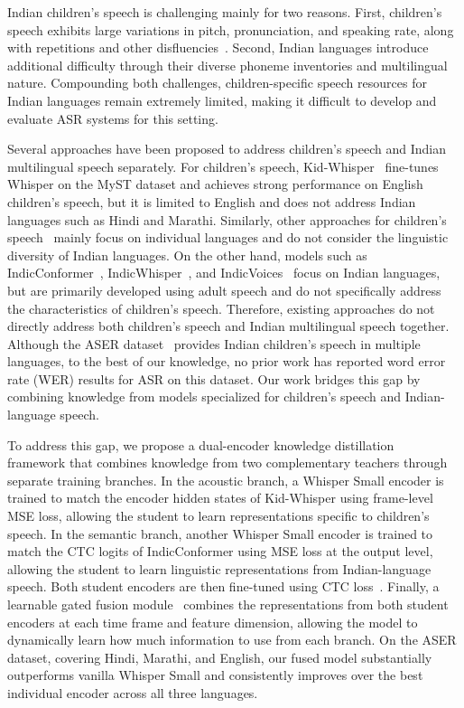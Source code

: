 \documentclass{article} %
\begin{document}
Indian children's speech is challenging mainly for two reasons. First, children's speech exhibits large variations in pitch, pronunciation, and speaking rate, along with repetitions and other disfluencies~\citep{lee1999acoustics}. Second, Indian languages introduce additional difficulty through their diverse phoneme inventories and multilingual nature. Compounding both challenges, children-specific speech resources for Indian languages remain extremely limited, making it difficult to develop and evaluate ASR systems for this setting.

Several approaches have been proposed to address children's speech and Indian multilingual speech separately. For children's speech, Kid-Whisper~\citep{attia2024kidwhisper} fine-tunes Whisper on the MyST dataset and achieves strong performance on English children's speech, but it is limited to English and does not address Indian languages such as Hindi and Marathi. Similarly, other approaches for children's speech~\citep{jain2023,liu2024} mainly focus on individual languages and do not consider the linguistic diversity of Indian languages. On the other hand, models such as IndicConformer~\citep{ai4bharat2024indicconformer}, IndicWhisper~\citep{bhogale2023indicwhisper}, and IndicVoices~\citep{javed2024indicvoices} focus on Indian languages, but are primarily developed using adult speech and do not specifically address the characteristics of children's speech. Therefore, existing approaches do not directly address both children's speech and Indian multilingual speech together. Although the ASER dataset~\citep{agarwal2019aser} provides Indian children's speech in multiple languages, to the best of our knowledge, no prior work has reported word error rate (WER) results for ASR on this dataset. Our work bridges this gap by combining knowledge from models specialized for children's speech and Indian-language speech.

To address this gap, we propose a dual-encoder knowledge distillation~\citep{hinton2015distilling} framework that combines knowledge from two complementary teachers through separate training branches. In the acoustic branch, a Whisper Small encoder is trained to match the encoder hidden states of Kid-Whisper using frame-level MSE loss, allowing the student to learn representations specific to children's speech. In the semantic branch, another Whisper Small encoder is trained to match the CTC logits of IndicConformer using MSE loss at the output level, allowing the student to learn linguistic representations from Indian-language speech. Both student encoders are then fine-tuned using CTC loss~\citep{graves2006ctc}. Finally, a learnable gated fusion module~\citep{arevalo2017gated} combines the representations from both student encoders at each time frame and feature dimension, allowing the model to dynamically learn how much information to use from each branch. On the ASER dataset, covering Hindi, Marathi, and English, our fused model substantially outperforms vanilla Whisper Small and consistently improves over the best individual encoder across all three languages.
\end{document}
